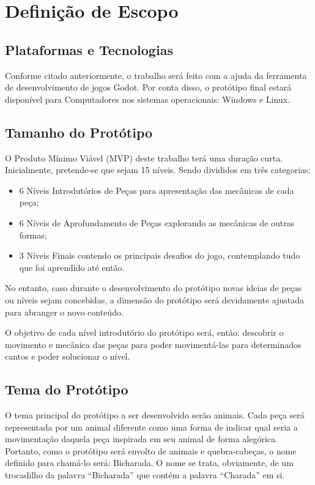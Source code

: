 \section{Definição de Escopo}

\subsection{Plataformas e Tecnologias}

Conforme citado anteriormente, o trabalho será feito com a ajuda da ferramenta de desenvolvimento de jogos Godot. Por conta disso, o protótipo final estará disponível para Computadores nos sistemas operacionais: Windows e Linux.

\subsection{Tamanho do Protótipo}

O Produto Mínimo Viável (MVP) deste trabalho terá uma duração curta. Inicialmente, pretende-se que sejam 15 níveis. Sendo divididos em três categorias:
\begin{itemize}
	\item 6 Níveis Introdutórios de Peças para apresentação das mecânicas de cada peça;
	\item 6 Níveis de Aprofundamento de Peças explorando as mecânicas de outras formas;
	\item 3 Níveis Finais contendo os principais desafios do jogo, contemplando tudo que foi aprendido até então.
\end{itemize}

No entanto, caso durante o desenvolvimento do protótipo novas ideias de peças ou níveis sejam concebidas, a dimensão do protótipo será devidamente ajustada para abranger o novo conteúdo.

O objetivo de cada nível introdutório do protótipo será, então: descobrir o movimento e mecânica das peças para poder movimentá-las para determinados cantos e poder solucionar o nível.

\subsection{Tema do Protótipo}

O tema principal do protótipo a ser desenvolvido serão animais. Cada peça será representada por um animal diferente como uma forma de indicar qual seria a movimentação daquela peça inspirada em seu animal de forma alegórica. Portanto, como o protótipo será envolto de animais e quebra-cabeças, o nome definido para chamá-lo será: Bicharada. O nome se trata, obviamente, de um trocadilho da palavra ``Bicharada'' que contém a palavra ``Charada'' em si.

